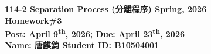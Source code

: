 ﻿\documentclass[12pt,a4paper]{article}
\begin{document}


\newcommand{\problem}[1]{%
  \item \underline{\textbf{Problem \arabic{problemsi} -- #1}}\par\vspace{0.2cm}
}

\begin{center}
    {\large \textbf{114-2 Separation Process (分離程序) Spring, 2026}}\\[0.3cm]
    {\Large \textbf{Homework\#3}}\\[0.3cm]
    {\textbf{Post: April 9\textsuperscript{th}, 2026; Due: April 23\textsuperscript{th}, 2026}}\\[0.4cm]
    \textbf{Name: 唐麒鈞 \quad Student ID: B10504001}
\end{center}
\vspace{0.8cm}
\end{document}
